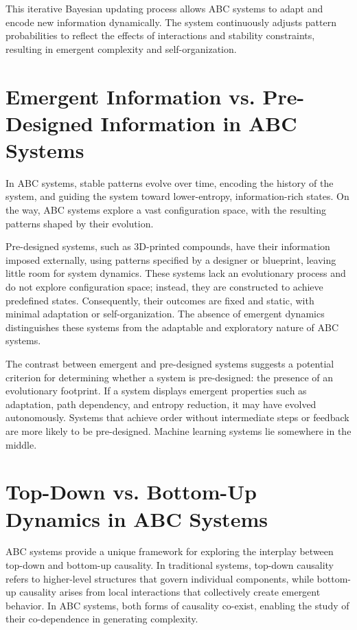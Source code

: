 \documentclass[entropy,article,submit,pdftex,moreauthors]{Definitions/mdpi}
\begin{document}
This iterative Bayesian updating process allows ABC systems to adapt and encode new information dynamically. The system continuously adjusts pattern probabilities to reflect the effects of interactions and stability constraints, resulting in emergent complexity and self-organization.

\section{Emergent Information vs. Pre-Designed Information in ABC Systems}

In ABC systems, stable patterns evolve over time, encoding the history of the system, and guiding the system toward lower-entropy, information-rich states. On the way, ABC systems explore a vast configuration space, with the resulting patterns shaped by their evolution.

Pre-designed systems, such as 3D-printed compounds, have their information imposed externally, using patterns specified by a designer or blueprint, leaving little room for system dynamics. These systems lack an evolutionary process and do not explore configuration space; instead, they are constructed to achieve predefined states. Consequently, their outcomes are fixed and static, with minimal adaptation or self-organization. The absence of emergent dynamics distinguishes these systems from the adaptable and exploratory nature of ABC systems.

The contrast between emergent and pre-designed systems suggests a potential criterion for determining whether a system is pre-designed: the presence of an evolutionary footprint. If a system displays emergent properties such as adaptation, path dependency, and entropy reduction, it may have evolved autonomously. Systems that achieve order without intermediate steps or feedback are more likely to be pre-designed. Machine learning systems lie somewhere in the middle.


\section{Top-Down vs. Bottom-Up Dynamics in ABC Systems}

ABC systems provide a unique framework for exploring the interplay between top-down and bottom-up causality. In traditional systems, top-down causality refers to higher-level structures that govern individual components, while bottom-up causality arises from local interactions that collectively create emergent behavior. In ABC systems, both forms of causality co-exist, enabling the study of their co-dependence in generating complexity.
\end{document}
